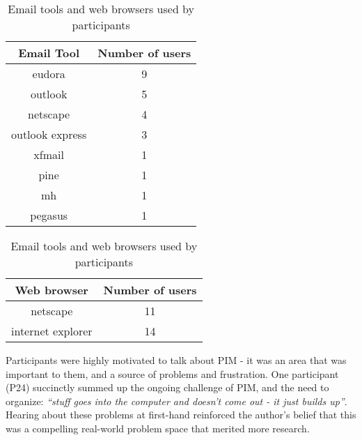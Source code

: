 \begin{table}[hbtp]
\begin{minipage}{3.0 in}
\begin{footnotesize}
\setlength{\extrarowheight}{2pt}
\begin{tabular}{|c|c|}
\hline
{\bf Email Tool} & {\bf Number of users} \\
\hline
    eudora &          9 \\
\hline
   outlook &          5 \\
\hline
  netscape &          4 \\
\hline
outlook express &          3 \\
\hline
    xfmail &          1 \\
\hline
      pine &          1 \\
\hline
        mh &          1 \\
\hline
   pegasus &          1 \\
\hline
\end{tabular}  
\end{footnotesize}
\end{minipage}
\begin{minipage}{3.0 in}
\begin{footnotesize}
\begin{tabular}{|c|c|}
\hline
{\bf Web browser} & {\bf Number of users} \\
\hline
  netscape &         11 \\
\hline
internet explorer &         14 \\
\hline
\end{tabular}  
\end{footnotesize}
\end{minipage}
\begin{center}
\caption{Email tools and web browsers used by participants}
\label{table:chapter3_email_and_browser_tools}
\end{center}
\end{table}



Participants were highly motivated to talk about PIM - it was an area that was important to them, and a source of problems and frustration.  One participant (P24) succinctly summed up the ongoing challenge of PIM, and the need to organize: \textit{``stuff goes into the computer and doesn't come out - it just builds up''}.  Hearing about these problems at first-hand reinforced the author's belief that this was a compelling real-world problem space that merited more research.

